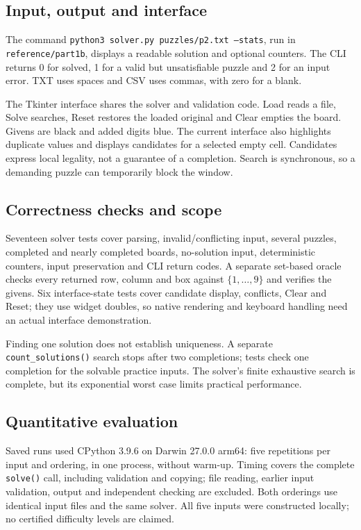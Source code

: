 \documentclass[11pt,a4paper]{article}
\begin{document}
\subsection{Input, output and interface}
The command \texttt{python3 solver.py puzzles/p2.txt --stats}, run in \texttt{reference/part1b}, displays a readable solution and optional counters. The CLI returns 0 for solved, 1 for a valid but unsatisfiable puzzle and 2 for an input error. TXT uses spaces and CSV uses commas, with zero for a blank.

The Tkinter interface shares the solver and validation code. Load reads a file, Solve searches, Reset restores the loaded original and Clear empties the board. Givens are black and added digits blue. The current interface also highlights duplicate values and displays candidates for a selected empty cell. Candidates express local legality, not a guarantee of a completion. Search is synchronous, so a demanding puzzle can temporarily block the window.

\subsection{Correctness checks and scope}
Seventeen solver tests cover parsing, invalid/conflicting input, several puzzles, completed and nearly completed boards, no-solution input, deterministic counters, input preservation and CLI return codes. A separate set-based oracle checks every returned row, column and box against $\{1,\ldots,9\}$ and verifies the givens. Six interface-state tests cover candidate display, conflicts, Clear and Reset; they use widget doubles, so native rendering and keyboard handling need an actual interface demonstration.

Finding one solution does not establish uniqueness. A separate \texttt{count\_solutions()} search stops after two completions; tests check one completion for the solvable practice inputs. The solver's finite exhaustive search is complete, but its exponential worst case limits practical performance.

\clearpage
\subsection{Quantitative evaluation}\label{evaluation}
Saved runs used CPython 3.9.6 on Darwin 27.0.0 arm64: five repetitions per input and ordering, in one process, without warm-up. Timing covers the complete \texttt{solve()} call, including validation and copying; file reading, earlier input validation, output and independent checking are excluded. Both orderings use identical input files and the same solver. All five inputs were constructed locally; no certified difficulty levels are claimed.
\end{document}
